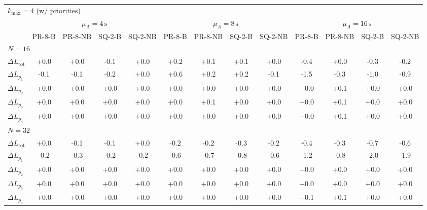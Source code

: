\begin{tabular}{l c c c c c c c c c c c c}
\toprule
\multicolumn{13}{l}{$k_{\max}=4$ (w/ priorities)} \\
\addlinespace[0.2em]
 & \multicolumn{4}{c}{$\mu_A=4\,\mathrm{s}$} & \multicolumn{4}{c}{$\mu_A=8\,\mathrm{s}$} & \multicolumn{4}{c}{$\mu_A=16\,\mathrm{s}$} \\
\cmidrule(lr){2-5}\cmidrule(lr){6-9}\cmidrule(lr){10-13}
 & PR-8-B & PR-8-NB & SQ-2-B & SQ-2-NB & PR-8-B & PR-8-NB & SQ-2-B & SQ-2-NB & PR-8-B & PR-8-NB & SQ-2-B & SQ-2-NB \\
\midrule
\multicolumn{13}{l}{${N=16}$} \\
\midrule
$\Delta L_{\mathrm{tot}}$ & +0.0 & +0.0 & -0.1 & +0.0 & +0.2 & +0.1 & +0.1 & +0.0 & -0.4 & +0.0 & -0.3 & -0.2 \\
$\Delta L_{p_1}$ & -0.1 & -0.1 & -0.2 & +0.0 & +0.6 & +0.2 & +0.2 & -0.1 & -1.5 & -0.3 & -1.0 & -0.9 \\
$\Delta L_{p_2}$ & +0.0 & +0.0 & +0.0 & +0.0 & +0.0 & +0.0 & +0.0 & +0.0 & +0.0 & +0.1 & +0.0 & +0.0 \\
$\Delta L_{p_3}$ & +0.0 & +0.0 & +0.0 & +0.0 & +0.0 & +0.1 & +0.0 & +0.0 & +0.0 & +0.1 & +0.0 & +0.0 \\
$\Delta L_{p_4}$ & +0.0 & +0.0 & +0.0 & +0.0 & +0.0 & +0.0 & +0.0 & +0.0 & +0.0 & +0.1 & +0.0 & +0.0 \\
\midrule
\multicolumn{13}{l}{${N=32}$} \\
\midrule
$\Delta L_{\mathrm{tot}}$ & +0.0 & -0.1 & -0.1 & +0.0 & -0.2 & -0.2 & -0.3 & -0.2 & -0.4 & -0.3 & -0.7 & -0.6 \\
$\Delta L_{p_1}$ & -0.2 & -0.3 & -0.2 & -0.2 & -0.6 & -0.7 & -0.8 & -0.6 & -1.2 & -0.8 & -2.0 & -1.9 \\
$\Delta L_{p_2}$ & +0.0 & +0.0 & +0.0 & +0.0 & +0.0 & +0.0 & +0.0 & +0.0 & +0.0 & +0.0 & +0.0 & +0.0 \\
$\Delta L_{p_3}$ & +0.0 & +0.0 & +0.0 & +0.0 & +0.0 & +0.0 & +0.0 & +0.0 & +0.0 & +0.0 & +0.0 & +0.0 \\
$\Delta L_{p_4}$ & +0.0 & +0.0 & +0.0 & +0.0 & +0.0 & +0.0 & +0.0 & +0.0 & +0.1 & +0.1 & +0.0 & +0.0 \\
\bottomrule
\end{tabular}
